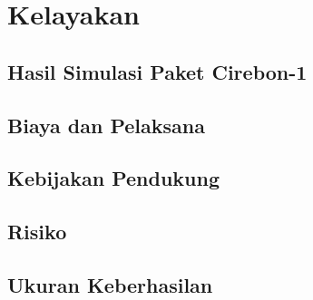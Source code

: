 \section{Kelayakan}
\label{sec:kelayakan}

\subsection{Hasil Simulasi Paket Cirebon-1}

\subsection{Biaya dan Pelaksana}

\subsection{Kebijakan Pendukung}

\subsection{Risiko}

\subsection{Ukuran Keberhasilan}
